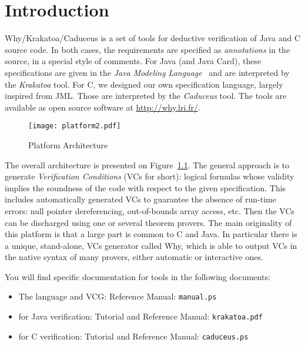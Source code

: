 \documentclass[a4paper,11pt,twoside,openright]{report}
\begin{document}
\sloppy
{}



\tableofcontents

\chapter{Introduction}

Why/Krakatoa/Caduceus is a set of tools for deductive verification of
Java and C source code. In both cases, the requirements are specified
as \emph{annotations} in the source, in a special style of comments.
For Java (and Java Card), these specifications are given in the
\emph{Java Modeling Language}~\cite{Burdy04} and are interpreted by
the \emph{Krakatoa} tool. For C, we designed our own specification
language, largely inspired from JML. Those are interpreted by the
\emph{Caduceus} tool. The tools are available as open source software
at \url{http://why.lri.fr/}. 

\begin{figure}
\begin{center}
\texttt{[image: platform2.pdf]}
\end{center}
\caption{Platform Architecture\label{fig:arch}}
\end{figure}

The overall architecture is presented on Figure~\ref{fig:arch}. The
general approach is to generate \emph{Verification Conditions} (VCs
for short): logical formulas whose validity implies the soundness of
the code with respect to the given specification.  This includes
automatically generated VCs to guarantee the absence of run-time
errors: null pointer dereferencing, out-of-bounds array access, etc.
Then the VCs can be discharged using one or several theorem provers.
The main originality of this platform is that a large part is common
to C and Java. In particular there is a unique, stand-alone, VCs
generator called Why, which is able to output VCs in the native syntax
of many provers, either automatic or interactive ones.


You will find specific documentation for tools in the following documents:
\begin{itemize}
\item The \Why{} language and VCG: Reference Manual: \texttt{manual.ps} 
\item \Krakatoa{} for Java verification: Tutorial and Reference Manual: \texttt{krakatoa.pdf} 
\item \Caduceus{} for C verification: Tutorial and Reference Manual: \texttt{caduceus.ps} 
\end{itemize}
\end{document}
